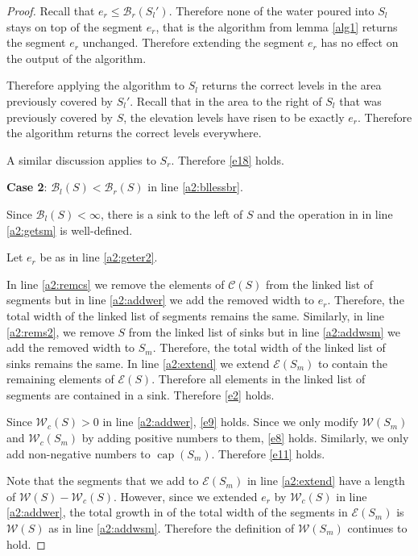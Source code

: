 \documentclass[11pt,a4paper]{article}
\DeclareMathOperator{\capp}{cap}
\begin{document}
\begin{proof}
Recall that $e_r\le\mathcal{B}_r(S_l')$.
Therefore none of the water poured into $S_l$ stays on top of the segment $e_r$, that is the algorithm from lemma \ref{alg1} returns the segment $e_r$ unchanged.
Therefore extending the segment $e_r$ has no effect on the output of the algorithm.

Therefore applying the algorithm to $S_l$ returns the correct levels in the area previously covered by $S_l'$.
Recall that in the area to the right of $S_l$ that was previously covered by $S$, the elevation levels have risen to be exactly $e_r$.
Therefore the algorithm returns the correct levels everywhere.

A similar discussion applies to $S_r$.
Therefore \ref{e18} holds.

\textbf{Case 2}: $\mathcal{B}_l(S) < \mathcal{B}_r(S)$ in line \ref{a2:bllessbr}.

Since $\mathcal{B}_l(S) < \infty$, there is a sink to the left of $S$ and the operation in
in line \ref{a2:getsm} is well-defined.

Let $e_r$ be as in line \ref{a2:geter2}.

In line \ref{a2:remcs} we remove the elements of $\mathcal{C}(S)$ from the linked list of segments but in line \ref{a2:addwer} we add the removed width to $e_r$.
Therefore, the total width of the linked list of segments remains the same.
Similarly, in line \ref{a2:rems2}, we remove $S$ from the linked list of sinks but in line \ref{a2:addwsm} we add the removed width to $S_m$.
Therefore, the total width of the linked list of sinks remains the same.
In line \ref{a2:extend} we extend $\mathcal{E}(S_m)$ to contain the remaining elements of $\mathcal{E}(S)$.
Therefore all elements in the linked list of segments are contained in a sink.
Therefore \ref{e2} holds.

Since $\mathcal{W}_c(S) > 0$ in line \ref{a2:addwer}, \ref{e9} holds.
Since we only modify $\mathcal{W}(S_m)$ and $\mathcal{W}_c(S_m)$ by adding positive numbers to them, \ref{e8} holds.
Similarly, we only add non-negative numbers to $\capp(S_m)$.
Therefore \ref{e11} holds.

Note that the segments that we add to $\mathcal{E}(S_m)$ in line \ref{a2:extend} have a length of $\mathcal{W}(S) - \mathcal{W}_c(S)$.
However, since we extended $e_r$ by $\mathcal{W}_c(S)$ in line \ref{a2:addwer}, the total growth in of the total width of the segments in $\mathcal{E}(S_m)$ is $\mathcal{W}(S)$ as in line \ref{a2:addwsm}.
Therefore the definition of $\mathcal{W}(S_m)$ continues to hold.


\end{proof}
\end{document}
